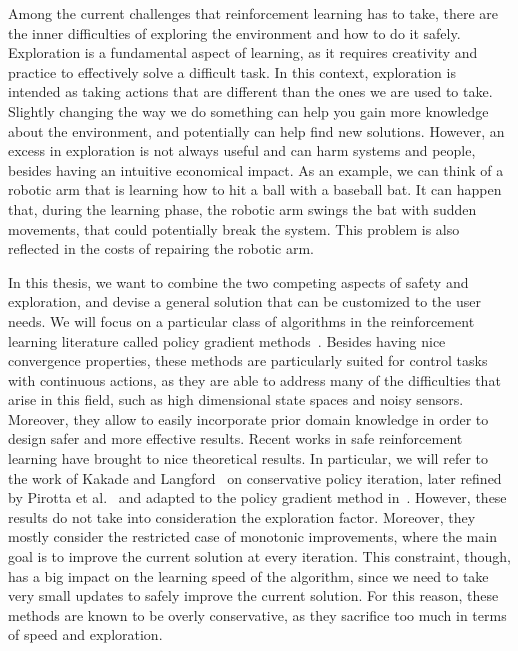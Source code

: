 Among the current challenges that reinforcement learning has to take, there are the inner difficulties of exploring the environment and how to do it safely. Exploration is a fundamental aspect of learning, as it requires creativity and practice to effectively solve a difficult task. In this context, exploration is intended as taking actions that are different than the ones we are used to take. Slightly changing the way we do something can help you gain more knowledge about the environment, and potentially can help find new solutions. However, an excess in exploration is not always useful and can harm systems and people, besides having an intuitive economical impact. As an example, we can think of a robotic arm that is learning how to hit a ball with a baseball bat. It can happen that, during the learning phase, the robotic arm swings the bat with sudden movements, that could potentially break the system. This problem is also reflected in the costs of repairing the robotic arm.

In this thesis, we want to combine the two competing aspects of safety and exploration, and devise a general solution that can be customized to the user needs. We will focus on a particular class of algorithms in the reinforcement learning literature called policy gradient methods~\cite{peters}. Besides having nice convergence properties, these methods are particularly suited for control tasks with continuous actions, as they are able to address many of the difficulties that arise in this field, such as high dimensional state spaces and noisy sensors. Moreover, they allow to easily incorporate prior domain knowledge in order to design safer and more effective results. Recent works in safe reinforcement learning have brought to nice theoretical results. In particular, we will refer to the work of Kakade and Langford~\cite{Kakade02approximatelyoptimal} on conservative policy iteration, later refined by Pirotta et al.~\cite{safe_iteration} and adapted to the policy gradient method in~\cite{adaptive_step}. However, these results do not take into consideration the exploration factor. Moreover, they mostly consider the restricted case of monotonic improvements, where the main goal is to improve the current solution at every iteration. This constraint, though, has a big impact on the learning speed of the algorithm, since we need to take very small updates to safely improve the current solution. For this reason, these methods are known to be overly conservative, as they sacrifice too much in terms of speed and exploration. 


